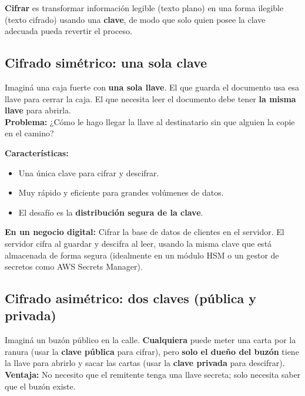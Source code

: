 \documentclass[12pt,a4paper]{article}
\begin{document}
\begin{cajaDefinicion}
\textbf{Cifrar} es transformar informaci\'on legible (texto plano) en una forma ilegible (texto cifrado) usando una \textbf{clave}, de modo que solo quien posee la clave adecuada pueda revertir el proceso.
\end{cajaDefinicion}

\subsection{Cifrado sim\'etrico: una sola clave}

\begin{cajaConcepto}[title={Analog\'ia del candado}]
Imagin\'a una caja fuerte con \textbf{una sola llave}. El que guarda el documento usa esa llave para cerrar la caja. El que necesita leer el documento debe tener \textbf{la misma llave} para abrirla.\\[4pt]
\textbf{Problema:} ¿C\'omo le hago llegar la llave al destinatario sin que alguien la copie en el camino?
\end{cajaConcepto}

\textbf{Caracter\'isticas:}
\begin{itemize}[leftmargin=2em]
  \item Una \'unica clave para cifrar y descifrar.
  \item Muy r\'apido y eficiente para grandes vol\'umenes de datos.
  \item El desaf\'io es la \textbf{distribuci\'on segura de la clave}.
\end{itemize}

\begin{cajaEjemplo}
\textbf{En un negocio digital:} Cifrar la base de datos de clientes en el servidor. El servidor cifra al guardar y descifra al leer, usando la misma clave que est\'a almacenada de forma segura (idealmente en un m\'odulo HSM o un gestor de secretos como AWS Secrets Manager).
\end{cajaEjemplo}

\subsection{Cifrado asim\'etrico: dos claves (p\'ublica y privada)}

\begin{cajaConcepto}[title={Analog\'ia del buz\'on}]
Imagin\'a un buz\'on p\'ublico en la calle. \textbf{Cualquiera} puede meter una carta por la ranura (usar la \textbf{clave p\'ublica} para cifrar), pero \textbf{solo el due\~no del buz\'on} tiene la llave para abrirlo y sacar las cartas (usar la \textbf{clave privada} para descifrar).\\[4pt]
\textbf{Ventaja:} No necesito que el remitente tenga una llave secreta; solo necesita saber que el buz\'on existe.
\end{cajaConcepto}
\end{document}
